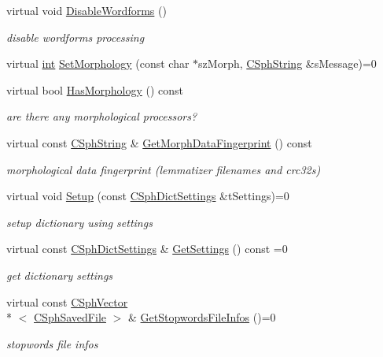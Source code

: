 \begin{DoxyCompactItemize}
virtual void \hyperlink{classCSphDict_a149569307cc87ce3c801e6b4477a14be}{Disable\-Wordforms} ()
\begin{DoxyCompactList}\small\item\em disable wordforms processing \end{DoxyCompactList}\item 
virtual \hyperlink{sphinxexpr_8cpp_a4a26e8f9cb8b736e0c4cbf4d16de985e}{int} \hyperlink{classCSphDict_af8a17c66efd05af6ab7f6c0c29412c5f}{Set\-Morphology} (const char $\ast$sz\-Morph, \hyperlink{structCSphString}{C\-Sph\-String} \&s\-Message)=0
\item 
virtual bool \hyperlink{classCSphDict_aec46465ef1e809c1bb33abee9bf12f51}{Has\-Morphology} () const 
\begin{DoxyCompactList}\small\item\em are there any morphological processors? \end{DoxyCompactList}\item 
virtual const \hyperlink{structCSphString}{C\-Sph\-String} \& \hyperlink{classCSphDict_a3858b945e5724a9cb6b36f37d494b9f8}{Get\-Morph\-Data\-Fingerprint} () const 
\begin{DoxyCompactList}\small\item\em morphological data fingerprint (lemmatizer filenames and crc32s) \end{DoxyCompactList}\item 
virtual void \hyperlink{classCSphDict_acbac5e4241f151135ab8fc6264b21259}{Setup} (const \hyperlink{structCSphDictSettings}{C\-Sph\-Dict\-Settings} \&t\-Settings)=0
\begin{DoxyCompactList}\small\item\em setup dictionary using settings \end{DoxyCompactList}\item 
virtual const \hyperlink{structCSphDictSettings}{C\-Sph\-Dict\-Settings} \& \hyperlink{classCSphDict_a1dd5e14a1021dea4cdc6c3c9edad6fad}{Get\-Settings} () const =0
\begin{DoxyCompactList}\small\item\em get dictionary settings \end{DoxyCompactList}\item 
virtual const \hyperlink{classCSphVector}{C\-Sph\-Vector}\\*
$<$ \hyperlink{structCSphSavedFile}{C\-Sph\-Saved\-File} $>$ \& \hyperlink{classCSphDict_a258f01ba4c99167f37450575438c6c18}{Get\-Stopwords\-File\-Infos} ()=0
\begin{DoxyCompactList}\small\item\em stopwords file infos \end{DoxyCompactList}\item 

\end{DoxyCompactItemize}
